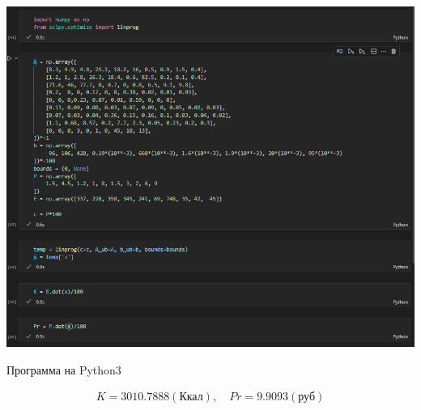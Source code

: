 \documentclass[a4paper, 12pt]{article}
\begin{document}
\includegraphics[width=\textwidth]{6-6.png}
\begin{center}
  Программа на Python3
\end{center}
\begin{align*}
  K = 3010.7888(\textit{Ккал}), \quad Pr = 9.9093(\textit{руб})
\end{align*}
\end{document}
